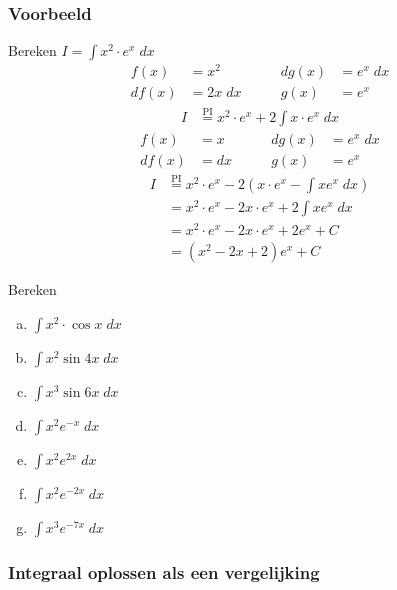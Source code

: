 \documentclass[a4paper,12pt, twoside]{article}
\begin{document}
\subsubsection*{Voorbeeld}
Bereken $\displaystyle I=\int x^2 \cdot e^x \; dx$
\begin{alignat*}{3}
  f(x) &= x^2 \qquad & dg(x) &= e^x \;dx\\
  df(x) &= 2x \;dx \qquad & g(x) &= e^x
\end{alignat*}
\begin{align*}
  I
  &\overset{\text{PI}}{=} x^2 \cdot e^x + 2\int x \cdot e^x \; dx
\end{align*}
\begin{alignat*}{3}
  f(x) &= x \qquad & dg(x) &= e^x \;dx\\
  df(x) &= dx \qquad & g(x) &= e^x
\end{alignat*}
\begin{align*}
  I
  &\overset{\text{PI}}{=} x^2 \cdot e^x -2 \left (x \cdot e^x - \int x e^x \; dx\right)\\
  &= x^2 \cdot e^x -2 x \cdot e^x + 2 \int x e^x \; dx\\
  &= x^2 \cdot e^x -2 x \cdot e^x + 2  e^x + C\\
  &= \left( x^2 -2 x + 2\right )  e^x + C
\end{align*}

\begin{oefening}
  Bereken
  \begin{multicols}{2}
  \begin{enumerate}[(a)]
  \item $\displaystyle\int x^2 \cdot \cos x \;dx$
  \item $\displaystyle\int x^2 \sin 4x \;dx$
  \item $\displaystyle\int x^3 \sin 6x \;dx$
  \item $\displaystyle\int x^2 e^{-x} \;dx$
  \item $\displaystyle\int x^2 e^{2x} \;dx$
  \item $\displaystyle\int x^2 e^{-2x} \;dx$
  \item $\displaystyle\int x^3 e^{-7x} \;dx$
  \end{enumerate}
\end{multicols}
\end{oefening}

\subsubsection{Integraal oplossen als een vergelijking}
\end{document}

